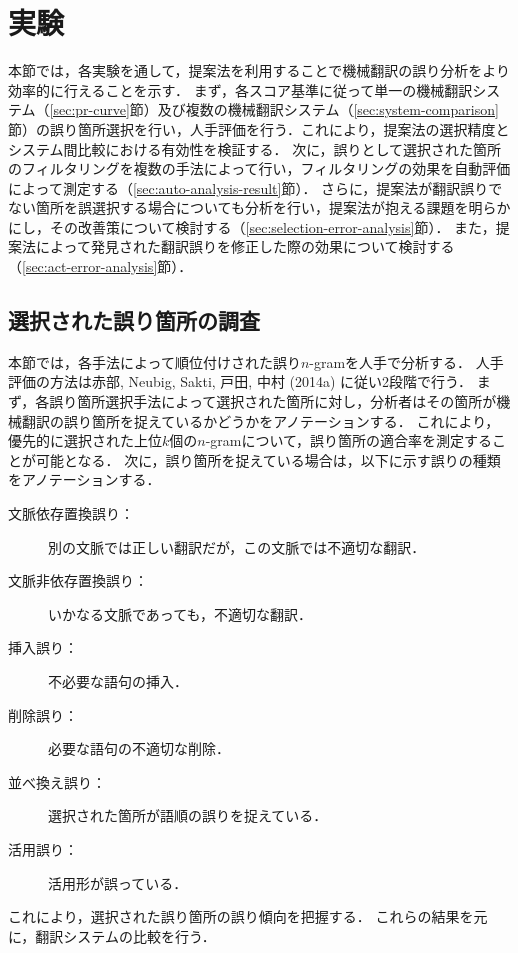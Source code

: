 \documentclass[japanese]{jnlp_1.4}
\begin{document}
\section{実験}
\label{sec:experiments}

本節では，各実験を通して，提案法を利用することで機械翻訳の誤り分析をより効率的に行えることを示す．
まず，各スコア基準に従って単一の機械翻訳システム（\ref{sec:pr-curve}節）及び複数の機械翻訳システム（\ref{sec:system-comparison}節）の誤り箇所選択を行い，人手評価を行う．これにより，提案法の選択精度とシステム間比較における有効性を検証する．
次に，誤りとして選択された箇所のフィルタリングを複数の手法によって行い，フィルタリングの効果を自動評価によって測定する（\ref{sec:auto-analysis-result}節）．
さらに，提案法が翻訳誤りでない箇所を誤選択する場合についても分析を行い，提案法が抱える課題を明らかにし，その改善策について検討する（\ref{sec:selection-error-analysis}節）．
また，提案法によって発見された翻訳誤りを修正した際の効果について検討する（\ref{sec:act-error-analysis}節）．


\subsection{選択された誤り箇所の調査}
\label{sec:manual-analysis-result}

本節では，各手法によって順位付けされた誤り$n$-gramを人手で分析する．
人手評価の方法は赤部, Neubig, Sakti, 戸田, 中村 (2014a) \nocite{akabe14signl216}に従い2段階で行う．
まず，各誤り箇所選択手法によって選択された箇所に対し，分析者はその箇所が機械翻訳の誤り箇所を捉えているかどうかをアノテーションする．
これにより，優先的に選択された上位$k$個の$n$-gramについて，誤り箇所の適合率を測定することが可能となる．
次に，誤り箇所を捉えている場合は，以下に示す誤りの種類をアノテーションする．

\begin{description}
\item[文脈依存置換誤り：] 別の文脈では正しい翻訳だが，この文脈では不適切な翻訳．
\item[文脈非依存置換誤り：] いかなる文脈であっても，不適切な翻訳．
\item[挿入誤り：] 不必要な語句の挿入．
\item[削除誤り：] 必要な語句の不適切な削除．
\item[並べ換え誤り：] 選択された箇所が語順の誤りを捉えている．
\item[活用誤り：] 活用形が誤っている．
\end{description}

これにより，選択された誤り箇所の誤り傾向を把握する．
これらの結果を元に，翻訳システムの比較を行う．
\end{document}

